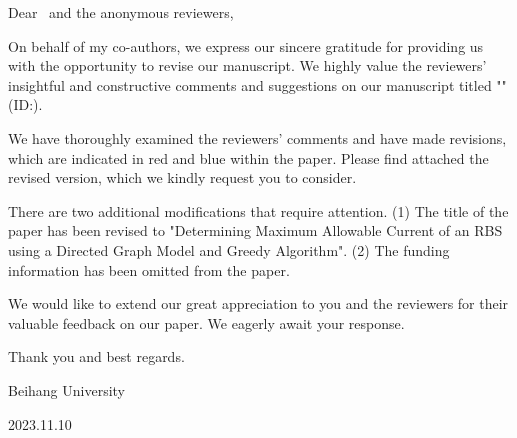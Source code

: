 \noindent Dear \editorname \, and the anonymous reviewers,

On behalf of my co-authors, we express our sincere gratitude for providing us with the opportunity to revise our manuscript. We highly value the reviewers' insightful and constructive comments and suggestions on our manuscript titled "\thetitle" (ID:\manuscript).

We have thoroughly examined the reviewers' comments and have made revisions, which are indicated in red and blue within the paper. Please find attached the revised version, which we kindly request you to consider.

There are two additional modifications that require attention.
(1) The title of the paper has been revised to "Determining Maximum Allowable Current of an RBS using a Directed Graph Model and Greedy Algorithm".
(2) The funding information has been omitted from the paper.

We would like to extend our great appreciation to you and the reviewers for their valuable feedback on our paper. We eagerly await your response.

Thank you and best regards.
\begin{flushright}
\theauthor

Beihang University

2023.11.10
\end{flushright}